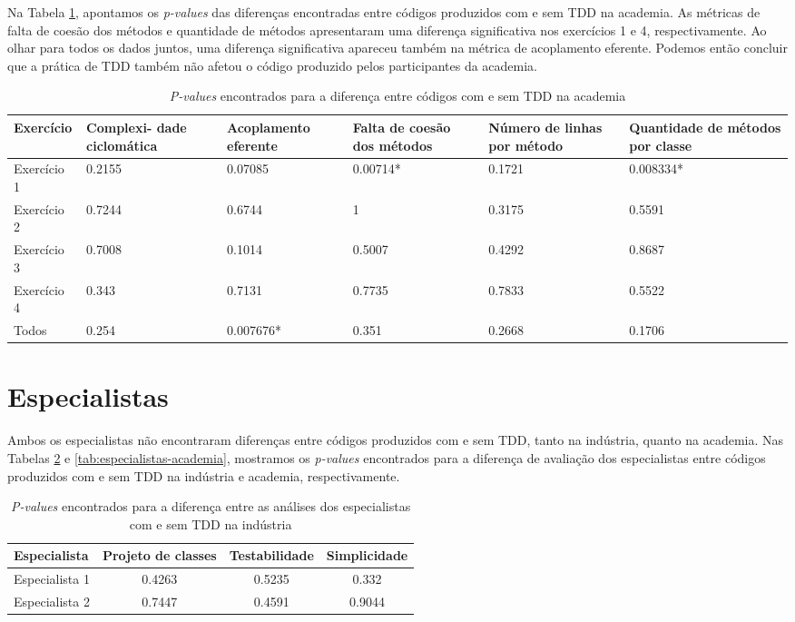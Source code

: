 Na Tabela \ref{metricas-academia}, apontamos os \textit{p-values} das diferenças encontradas
entre códigos produzidos com e sem TDD na academia. As métricas de 
falta de coesão dos métodos e quantidade de métodos apresentaram
uma diferença significativa nos exercícios 1 e 4, respectivamente.
Ao olhar para todos os dados juntos, uma diferença significativa
apareceu também na métrica de acoplamento eferente.
Podemos então concluir que a prática de TDD também não afetou
o código produzido pelos participantes da academia.

\begin{table}[h!]
	\centering
	\begin{tabular}{ | p{3cm} | p{2cm} | p{2cm} | p{2cm} | p{2cm} | p{2cm} |}
		\hline
		Exercício & Complexi- dade ciclomática & Acoplamento eferente & Falta de coesão dos métodos & Número de linhas por método 
		& Quantidade de métodos por classe \\
		\hline
			Exercício 1	& 0.2155	&	0.07085	& 0.00714* &	0.1721	& 0.008334*\\
			Exercício 2	& 0.7244	&	0.6744	& 1 &	0.3175 &	0.5591\\
			Exercício 3	& 0.7008	&	0.1014 &	0.5007	& 0.4292	& 0.8687\\
			Exercício 4	& 0.343	&	0.7131 &	0.7735	& 0.7833	& 0.5522\\
		\hline
			Todos &	0.254	&	0.007676* & 0.351 & 0.2668 & 0.1706\\
		\hline
	\end{tabular}
	\caption{\textit{P-values} encontrados para a diferença entre códigos com e sem TDD na academia}
	\label{metricas-academia}
\end{table}

\section{Especialistas}

Ambos os especialistas não encontraram diferenças entre códigos produzidos
com e sem TDD, tanto na indústria, quanto na academia. Nas Tabelas 
\ref{tab:especialistas-industria} e \ref{tab:especialistas-academia},
mostramos os \textit{p-values} encontrados para a diferença de avaliação dos especialistas
entre códigos produzidos com e sem TDD na indústria e academia, respectivamente.


\begin{table}[h!]
	\centering
	\begin{tabular}{| p{5cm} | c | c | c | }
		\hline
		Especialista & Projeto de classes & Testabilidade & Simplicidade\\
		\hline
		Especialista 1 &	0.4263 &	0.5235 &	0.332\\
		Especialista 2 &	0.7447 &	0.4591 &	0.9044\\
		\hline
	\end{tabular}
	\caption{\textit{P-values} encontrados para a diferença entre as análises dos especialistas com e sem TDD na indústria}
	\label{tab:especialistas-industria}
\end{table}

